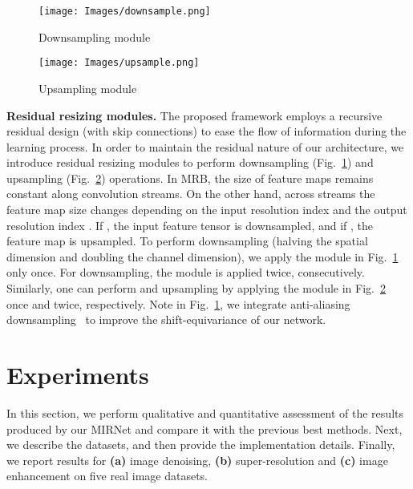 \documentclass[runningheads]{llncs}
\begin{document}
\begin{figure*}[t]
\centering
    \begin{subfigure}[t]{0.49\textwidth}
      \texttt{[image: Images/downsample.png]}
      \caption{\small Downsampling module}
      \label{fig:downsample}
    \end{subfigure}
    \begin{subfigure}[t]{0.49\textwidth}
      \texttt{[image: Images/upsample.png]}
      \caption{\small Upsampling module}
      \label{fig:upsample}
    \end{subfigure}
\vspace{-3mm}
\caption{\small Residual resizing modules to perform downsampling and upsampling. }
\vspace{-1.5em}
\end{figure*}



\vspace{0.2em} \noindent \textbf{Residual resizing modules.}
The proposed framework employs a recursive residual design (with skip connections) to ease the flow of information during the learning process. In order to maintain the residual nature of our architecture, we introduce residual resizing modules to perform downsampling (Fig.~\ref{fig:downsample}) and upsampling (Fig.~\ref{fig:upsample}) operations.   
In MRB, the size of feature maps remains constant along convolution streams.
On the other hand, across streams the feature map size changes depending on the input resolution index  and the output resolution index .
If , the input feature tensor is downsampled, and if , the feature map is upsampled.
To perform  downsampling (halving the spatial dimension and doubling the channel dimension), we apply the module in Fig.~\ref{fig:downsample} only once. For  downsampling, the module is applied twice, consecutively.
Similarly, one can perform  and  upsampling by applying the module in Fig.~\ref{fig:upsample} once and twice, respectively. 
Note in Fig.~\ref{fig:downsample}, we integrate anti-aliasing downsampling~\cite{zhang2019making} to improve the shift-equivariance of our network. 





\section{Experiments}
In this section, we perform qualitative and quantitative assessment of the results produced by our MIRNet and compare it with the previous best methods. 
Next, we describe the datasets, and then provide the implementation details. Finally, we report results for \textbf{(a)} image denoising, \textbf{(b)} super-resolution and \textbf{(c)} image enhancement on five real image datasets. 
\end{document}
